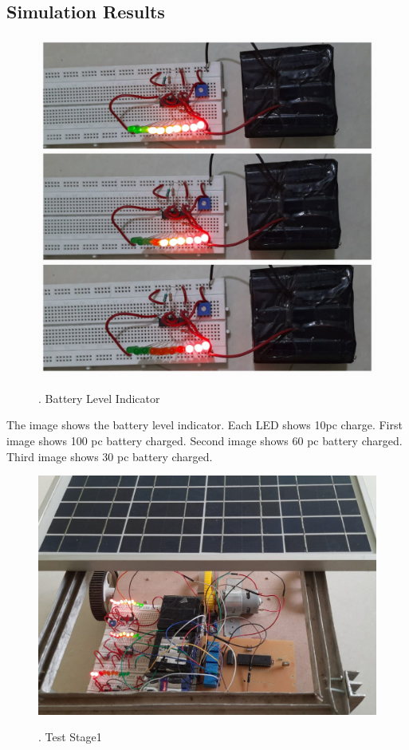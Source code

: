 \documentclass[a4paper,12pt]{article}
\begin{document}
\subsection{Simulation Results}
\begin{figure}[!h]
\centering
\includegraphics[scale=0.3]{bli.jpeg}\\
\caption{. Battery Level Indicator}
\end{figure}

The image shows the battery level indicator. Each LED shows 10pc charge. First image shows 100 pc battery charged. Second image shows 60 pc battery charged. Third image shows 30 pc battery charged. \\

\newpage
\begin{figure}[!h]
\centering
\includegraphics[scale=0.25]{hw2.jpeg}\\
\caption{. Test Stage1}
\end{figure}
\end{document}
